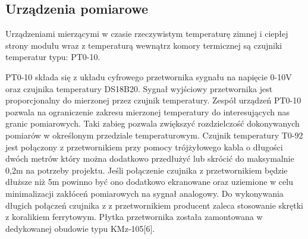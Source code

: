 \documentclass[oneside]{mgr}
\begin{document}
\subsection{Urządzenia pomiarowe}
Urządzeniami mierzącymi w czasie rzeczywistym temperaturę zimnej i ciepłej strony modułu wraz z temperaturą wewnątrz komory termicznej są czujniki temperatur typu: PT0-10. 

PT0-10 składa się z układu cyfrowego przetwornika sygnału na napięcie 0-10V oraz czujnika temperatury DS18B20. Sygnał wyjściowy przetwornika jest proporcjonalny do mierzonej przez czujnik temperatury. Zespół urządzeń PT0-10 pozwala na ograniczenie zakresu mierzonej temperatury do interesujących nas granic pomiarowych. Taki zabieg pozwala zwiększyć rozdzielczość dokonywanych pomiarów w określonym przedziale temperaturowym. Czujnik temperatury T0-92 jest połączony z przetwornikiem przy pomocy trójżyłowego kabla o długości dwóch metrów który można dodatkowo przedłużyć lub skrócić do maksymalnie 0,2m na potrzeby projektu. Jeśli połączenie czujnika z przetwornikiem będzie dłuższe niż 5m powinno być ono dodatkowo ekranowane oraz uziemione w celu minimalizacji zakłóceń pomiarowych na sygnał analogowy. Do wykonywania długich połączeń czujnika z z przetwornikiem producent zaleca stosowanie skrętki z koralikiem ferrytowym. Płytka przetwornika została zamontowana w dedykowanej obudowie typu KMz-105[6].
\end{document}
